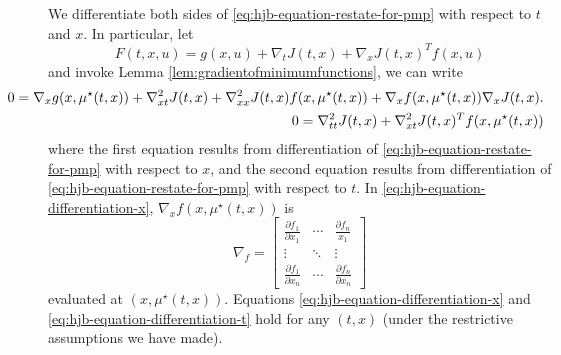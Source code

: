\documentclass[
]{book}
\theoremstyle{definition}
\theoremstyle{definition}
\theoremstyle{definition}
\theoremstyle{definition}
\theoremstyle{remark}
\begin{document}
We differentiate both sides of \eqref{eq:hjb-equation-restate-for-pmp} with respect to \(t\) and \(x\). In particular, let
\[
F(t,x,u) = g(x,u) + \nabla_t J(t,x) + \nabla_x J(t,x)^T f(x,u)
\]
and invoke Lemma \ref{lem:gradientofminimumfunctions}, we can write
\begin{align}
\label{eq:hjb-equation-differentiation-x}
\hspace{-12mm}
0 = \nabla_x g(x, \mu^\star(t,x)) + \nabla^2_{xt} J(t,x) + \nabla^2_{xx} J(t,x)f(x,\mu^\star(t,x)) + \nabla_x f(x,\mu^\star(t,x)) \nabla_x J(t,x).\\
\hspace{-12mm} 0 = \nabla^2_{tt}J(t,x) + \nabla_{xt}^2 J(t,x)^T f(x,\mu^\star(t,x)) 
\label{eq:hjb-equation-differentiation-t}
\end{align}
where the first equation results from differentiation of \eqref{eq:hjb-equation-restate-for-pmp} with respect to \(x\), and the second equation results from differentiation of \eqref{eq:hjb-equation-restate-for-pmp} with respect to \(t\). In \eqref{eq:hjb-equation-differentiation-x}, \(\nabla_x f(x,\mu^\star(t,x))\) is
\[
\nabla_f = \begin{bmatrix}
\frac{\partial f_1}{\partial x_1} & \cdots & \frac{\partial f_n}{x_1} \\
\vdots & \ddots & \vdots \\
\frac{\partial f_1}{\partial x_n} & \cdots & \frac{\partial f_n}{\partial x_n}
\end{bmatrix}
\]
evaluated at \((x,\mu^\star(t,x))\).
Equations \eqref{eq:hjb-equation-differentiation-x} and \eqref{eq:hjb-equation-differentiation-t} hold for any \((t,x)\) (under the restrictive assumptions we have made).
\end{document}
